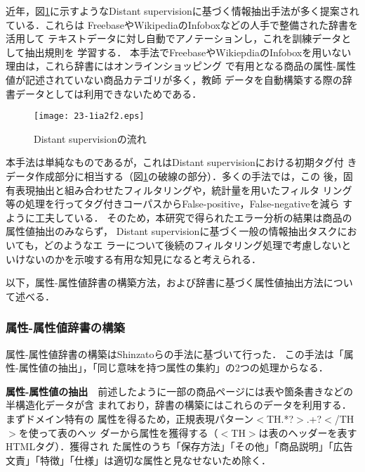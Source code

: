 \documentclass[japanese]{jnlp_1.4}
\begin{document}
近年，図\ref{flow-of-ds}に示すようなDistant supervisionに基づく情報抽出手法が多く提案されている\cite{mintz2009,wu2010,takamatsu2012,ritter2013,xu2013}．これらは FreebaseやWikipediaのInfoboxなどの人手で整備された辞書を活用して
テキストデータに対し自動でアノテーションし，これを訓練データとして抽出規則を
学習する．
本手法でFreebaseやWikiepdiaのInfoboxを用いない理由は，これら辞書にはオンラインショッピング
で有用となる商品の属性-属性値が記述されていない商品カテゴリが多く，教師
データを自動構築する際の辞書データとしては利用できないためである．

\begin{figure}[t]
\begin{center}
\texttt{[image: 23-1ia2f2.eps]}
\end{center}
\caption{Distant supervisionの流れ}
\label{flow-of-ds}
\end{figure}

本手法は単純なものであるが，これはDistant supervisionにおける初期タグ付
きデータ作成部分に相当する（図\ref{flow-of-ds}の破線の部分）．多くの手法では，この
後，固有表現抽出と組み合わせたフィルタリングや，統計量を用いたフィルタ
リング等の処理を行ってタグ付きコーパスからFalse-positive，False-negativeを減ら
すように工夫している\cite{roth2013}．
そのため，本研究で得られたエラー分析の結果は商品の属性値抽出のみならず，
Distant supervisionに基づく一般の情報抽出タスクにおいても，どのようなエ
ラーについて後続のフィルタリング処理で考慮しないといけないのかを示唆する有用な知見になると考えられる．

以下，属性-属性値辞書の構築方法，および辞書に基づく属性値抽出方法について述べる．


\subsubsection{属性-属性値辞書の構築}
\label{dictbuild}

属性-属性値辞書の構築はShinzatoらの手法\cite{shinzato2013}に基づいて行った．
この手法は「属性-属性値の抽出」，「同じ意味を持つ属性の集約」の2つの処理からなる．

\vspace{1\Cvs}
\noindent
\textbf{属性-属性値の抽出}　前述したように一部の商品ページには表や箇条書きなどの半構造化データが含
まれており，辞書の構築にはこれらのデータを利用する．まずドメイン特有の
属性を得るため，正規表現パターン$<$TH.*?$>$.+?$<$/TH$>$を使って表のヘッ
ダーから属性を獲得する（$<$TH$>$は表のヘッダーを表すHTMLタグ）．獲得され
た属性のうち「保存方法」「その他」「商品説明」「広告文責」「特徴」「仕様」は適切な属性と見なせないため除く．
\end{document}
